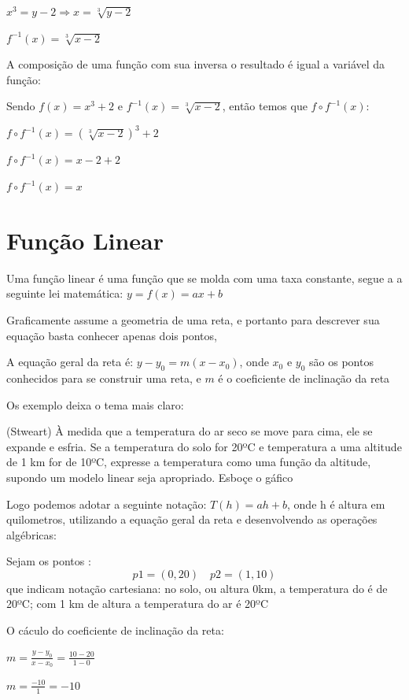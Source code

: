 \begin{multicols*}{2}
    $x^3 = y - 2 \Rightarrow x = \sqrt[3]{y - 2}$

    $f^{-1}(x) = \sqrt[3]{x - 2}$

    A composição de uma função com sua inversa o resultado é igual a variável da função:

    Sendo $f(x) = x^3 +2$ e $f^{-1}(x) = \sqrt[3]{x - 2}$, então temos que $f \circ f^{-1}(x)$:

    $f \circ f^{-1}(x) = (\sqrt[3]{x - 2})^3 +2$

    $f \circ f^{-1}(x) = x -2 +2$

    $f \circ f^{-1}(x) = x$
    \section*{ Função Linear}
    Uma função linear é uma função que se molda com uma taxa constante, segue a a seguinte lei 				matemática: $y = f(x) = ax + b$

    Graficamente assume a geometria de uma reta, e portanto para descrever sua equação basta 				conhecer apenas dois pontos,

    A equação geral da reta é: $y - y_0 = m(x-x_0)$, onde $x_0$ e $y_0$ são os pontos conhecidos 			para se construir uma reta, e $m$ é o coeficiente de inclinação da reta

    Os exemplo deixa o tema mais claro:


    (Stweart) À medida que a temperatura do ar seco se move para cima, ele se expande e 					esfria. Se a temperatura do solo for 20ºC e temperatura a uma altitude de 1 km for de 10ºC, 			expresse a temperatura como uma função da altitude, supondo um modelo linear seja apropriado. 			Esboçe o gáfico

    Logo podemos adotar a seguinte notação: $T(h) = ah +b$, onde h é altura em quilometros, 				utilizando a equação geral da reta e desenvolvendo as operações algébricas:

    Sejam os pontos :
    \begin{equation}
        p1 = (0,20) \quad
        p2 = (1,10)
    \end{equation}
    que indicam notação cartesiana: no solo, ou altura 0km, a temperatura do é de 20ºC; com 1 km de 		altura a temperatura do ar é 20ºC

    O cáculo do coeficiente de inclinação da reta:

    $m = \frac{y-y_0}{x - x_0} = \frac{ 10 - 20}{ 1 - 0}$

    $m = \frac{-10}{1} = -10$


\end{multicols*}
